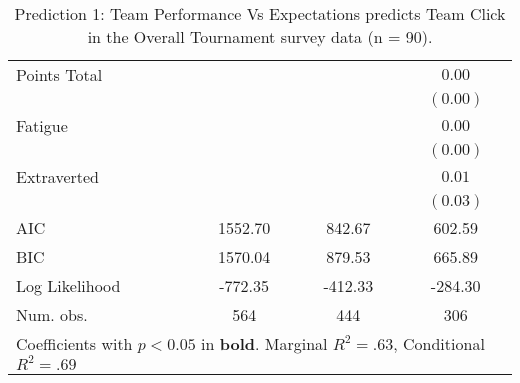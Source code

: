 \begin{table}
\begin{center}
\begin{tabular}{l c c c }
Points Total                                                      &          &                       & $0.00$                \\
                                                                  &          &                       & $(0.00)$              \\
Fatigue                                                           &          &                       & $0.00$                \\
                                                                  &          &                       & $(0.00)$              \\
Extraverted                                                       &          &                       & $0.01$                \\
                                                                  &          &                       & $(0.03)$              \\
\midrule
AIC                                                               & 1552.70  & 842.67                & 602.59                \\
BIC                                                               & 1570.04  & 879.53                & 665.89                \\
Log Likelihood                                                    & -772.35  & -412.33               & -284.30               \\
Num. obs.                                                         & 564      & 444                   & 306                   \\
\bottomrule
\multicolumn{4}{l}{\scriptsize{Coefficients with $p < 0.05$ in \textbf{bold}. Marginal $R^2 = .63$, Conditional $R^2 = .69$}}
\end{tabular}
\caption{Prediction 1: Team Performance Vs Expectations predicts Team Click in the Overall Tournament survey data (n = 90).}
\label{tab:MLM31ateamPerfClickTournament}
\end{center}
\end{table}
